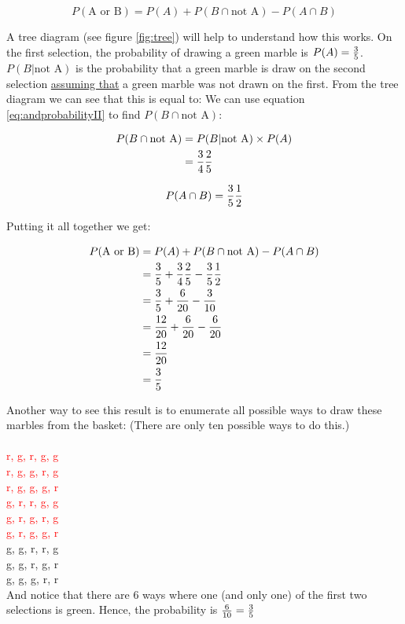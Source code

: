  \begin{equation}
   P(\text{A or B}) = P(A) + P(B\cap  \text{not A}) - P(A \cap B)\label{eq:oreventsdependent}
 \end{equation}

 A tree diagram (see figure \ref{fig:tree}) will help to understand
 how this works.  On the first selection, the probability of drawing a
 green marble is $P(A) =  {3\over 5}$.  $P(B| \text{not A})$ is the
 probability that a green marble is draw on the second selection
 \underline{assuming that} a green marble was not drawn on the first.
 From the tree diagram we can see that this is equal to:  We can use
 equation \eqref{eq:andprobabilityII} to find $P(B\cap \text{not A})$:

 \begin{align}
   P(B\cap \text{not A}) &= P(B| \text{not A}) \times P(A)\nonumber \\
                         &= {3\over 4} {2\over 5}\nonumber
 \end{align}

 \begin{equation}
   P(A \cap B) = {3\over 5}{1\over 2}\nonumber
\end{equation}

Putting it all together we get:

  \begin{align}
   P(\text{A or B}) &= P(A) + P(B\cap  \text{not A}) - P(A \cap
                      B)\\\nonumber
                      &= {3\over 5} + {3\over 4}{2\over 5} - {3\over 5}{1\over 2}\\\nonumber
                      &= {3\over 5} + {6\over 20} - {3\over 10}\\\nonumber
                      &= {12\over 20} + {6\over 20} - {6\over 20}\\\nonumber
                      &= {12\over 20}\\\nonumber
                      &= {3\over 5}\nonumber
 \end{align}

 Another way to see this result is to enumerate all possible ways to
 draw these marbles from the basket: (There are only ten possible ways
 to do this.)\\

 
\\
 \textcolor{red}{r, g, r, g, g}\\
\textcolor{red} {r, g, g, r, g}\\
 \textcolor{red}{r, g, g, g, r}\\
 \textcolor{red}{g, r, r, g, g}\\
 \textcolor{red}{g, r, g, r, g}\\
 \textcolor{red}{g, r, g, g, r}\\
 {g, g, r, r, g}\\
 {g, g, r, g, r}\\
 {g, g, g, r, r}\\


 And notice that there are 6 ways where one (and only one) of the
 first two selections is green.  Hence, the probability is ${6\over
   10} = {3\over 5}$
